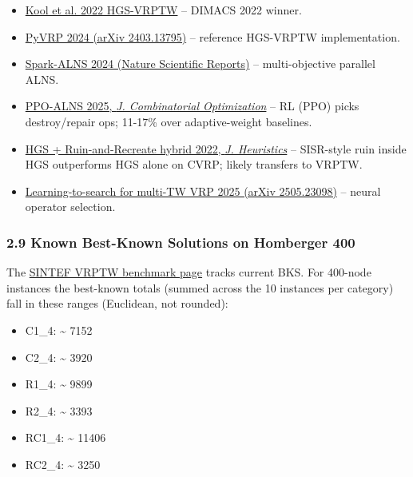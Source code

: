 \documentclass[twocolumn,10pt,letterpaper]{article}
\begin{document}
\begin{itemize}
\setlength{\itemsep}{0pt}
\setlength{\parskip}{0pt}
  \item \href{https://wouterkool.github.io/pdf/paper-kool-hgs-vrptw.pdf}{Kool et al. 2022 HGS-VRPTW} -- DIMACS 2022 winner.
  \item \href{https://arxiv.org/pdf/2403.13795}{PyVRP 2024 (arXiv 2403.13795)} -- reference HGS-VRPTW implementation.
  \item \href{https://www.nature.com/articles/s41598-024-74432-2}{Spark-ALNS 2024 (Nature Scientific Reports)} -- multi-objective parallel ALNS.
  \item \href{https://link.springer.com/article/10.1007/s10878-025-01364-6}{PPO-ALNS 2025, \textit{J. Combinatorial Optimization}} -- RL (PPO) picks destroy/repair ops; 11-17\% over adaptive-weight baselines.
  \item \href{https://link.springer.com/article/10.1007/s10732-022-09500-9}{HGS + Ruin-and-Recreate hybrid 2022, \textit{J. Heuristics}} -- SISR-style ruin inside HGS outperforms HGS alone on CVRP; likely transfers to VRPTW.
  \item \href{https://arxiv.org/pdf/2505.23098}{Learning-to-search for multi-TW VRP 2025 (arXiv 2505.23098)} -- neural operator selection.
\end{itemize}

\subsubsection{2.9 Known Best-Known Solutions on Homberger 400}

The \href{https://www.sintef.no/projectweb/top/vrptw/homberger-benchmark/400-customers/}{SINTEF VRPTW benchmark page} tracks current BKS. For 400-node instances the best-known totals (summed across the 10 instances per category) fall in these ranges (Euclidean, not rounded):


\begin{itemize}
\setlength{\itemsep}{0pt}
\setlength{\parskip}{0pt}
  \item C1\_4: \textasciitilde{} 7152
  \item C2\_4: \textasciitilde{} 3920
  \item R1\_4: \textasciitilde{} 9899
  \item R2\_4: \textasciitilde{} 3393
  \item RC1\_4: \textasciitilde{} 11406
  \item RC2\_4: \textasciitilde{} 3250
\end{itemize}
\end{document}
